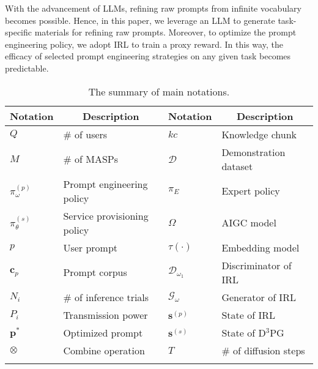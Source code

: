 With the advancement of LLMs, refining raw prompts from infinite vocabulary becomes possible.
Hence, in this paper, we leverage an LLM to generate task-specific materials for refining raw prompts.
Moreover, to optimize the prompt engineering policy, we adopt IRL \cite{zhang2023tempera, Prompt-OIRL} to train a proxy reward.
In this way, the efficacy of selected prompt engineering strategies on any given task becomes predictable.
\renewcommand{\arraystretch}{1.2}
\begin{table}
\caption{The summary of main notations.}
\begin{tabular}{l|p{2.5cm}|l|p{2.5cm}}
\Xhline{2.2pt}
\rowcolor[rgb]{0.92,0.92,0.92}
\textbf{Notation}&\multicolumn{1}{c|}{\textbf{Description}}&\textbf{Notation}&\multicolumn{1}{c}{\textbf{Description}}\\
\hline
$Q$ & \# of users & $kc$ &Knowledge chunk\\
\hline
$M$& \# of MASPs & $\mathcal{D}$ & Demonstration dataset\\
\hline
$\pi^{(p)}_\omega$ & Prompt engineering policy& $\pi_E$ & Expert policy\\
\hline
$\pi^{(s)}_\theta$ & Service provisioning policy& $\Omega$ &AIGC model\\
\hline
$p$ & User prompt& $\tau(\cdot)$ & Embedding model\\
\hline
$\mathbf{c}_p$ & Prompt corpus& $\mathcal{D}_{\omega_1}$& Discriminator of IRL\\
\hline
$N_i$& \# of inference trials & $\mathcal{G}_\omega$& Generator of IRL\\
\hline
$P_i$& Transmission power & $\mathbf{s}^{(p)}$ & State of IRL\\
\hline
$\mathbf{p}^{*}$& Optimized prompt & $\mathbf{s}^{(s)}$ & State of D$^3$PG\\
\hline
$\otimes$& Combine operation & $T$ & \# of diffusion steps\\
\Xhline{2.2pt}
\end{tabular}
\vspace{-0.2cm}
\end{table}
\renewcommand{\arraystretch}{1}